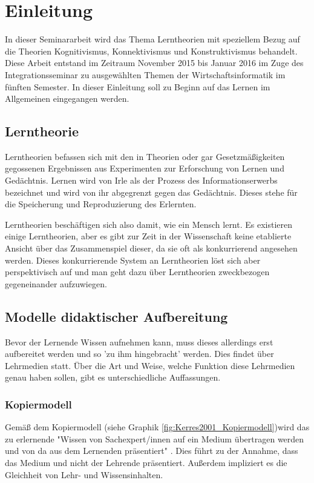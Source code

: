 \chapter{Einleitung}
\label{cha:Einleitung}
In dieser Seminararbeit wird das Thema Lerntheorien mit speziellem Bezug auf die Theorien Kognitivismus, Konnektivismus und Konstruktivismus behandelt. Diese Arbeit entstand im Zeitraum November 2015 bis Januar 2016 im Zuge des Integrationsseminar zu ausgewählten Themen der Wirtschaftsinformatik im fünften Semester. In dieser Einleitung soll zu Beginn auf das Lernen im Allgemeinen eingegangen werden.

\section{Lerntheorie}
\label{sec:Lerntheorie}
Lerntheorien befassen sich mit den in Theorien oder gar Gesetzmäßigkeiten gegossenen Ergebnissen aus Experimenten zur Erforschung von Lernen und Gedächtnis. Lernen wird von Irle als der Prozess des Informationserwerbs bezeichnet und wird von ihr abgegrenzt gegen das Gedächtnis. Dieses stehe für die Speicherung und Reproduzierung des Erlernten. \cite[]{Irle.1986}

Lerntheorien beschäftigen sich also damit, wie ein Mensch lernt. \cite{Reinmann.2013} Es existieren einige Lerntheorien, aber es gibt zur Zeit in der Wissenschaft keine etablierte Ansicht über das Zusammenspiel dieser, da sie oft als konkurrierend angesehen werden. \cite[S. 172 - 173]{Weinert.1996} Dieses konkurrierende System an Lerntheorien löst sich aber perspektivisch auf \cite{WittKerres.2002} und man geht dazu über Lerntheorien zweckbezogen gegeneinander aufzuwiegen. \cite{Reinmann.2013}

\section{Modelle didaktischer Aufbereitung}
\label{sec:Lernmodelle}
Bevor der Lernende Wissen aufnehmen kann, muss dieses allerdings erst aufbereitet werden und so 'zu ihm hingebracht' werden. Dies findet über Lehrmedien statt. Über die Art und Weise, welche Funktion diese Lehrmedien genau haben sollen, gibt es unterschiedliche Auffassungen.

\subsection{Kopiermodell}
\label{sub:Kopiermodell}
Gemäß dem Kopiermodell (siehe Graphik \ref{fig:Kerres2001_Kopiermodell})wird das zu erlernende "Wissen von Sachexpert/innen auf ein Medium übertragen werden und von da aus dem Lernenden präsentiert" \cite[S. 146]{Kerres.2001}. Dies führt zu der Annahme, dass das Medium und nicht der Lehrende präsentiert. Außerdem impliziert es die Gleichheit von Lehr- und Wissensinhalten.

